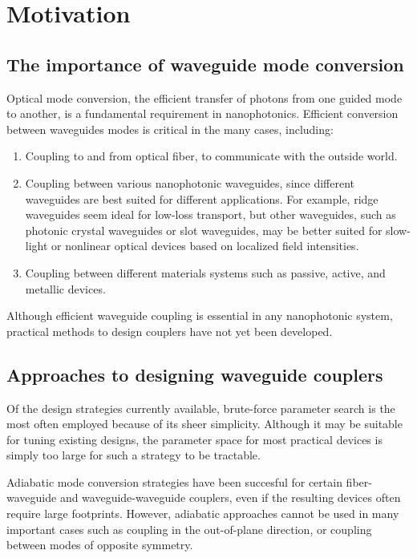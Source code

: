 \documentclass[letterpaper,10pt]{article}
\begin{document}
\section{Motivation}

\subsection{The importance of waveguide mode conversion}
Optical mode conversion, 
    the efficient transfer of photons from one guided mode to another,
    is a fundamental requirement in nanophotonics.
Efficient conversion between waveguides modes
    is critical in the many cases, including:
    \begin{enumerate}
        \item Coupling to and from optical fiber\cite{fibergrating}, 
        to communicate with the outside world.
    \item Coupling between various nanophotonic waveguides, 
        since different waveguides are best suited for different applications.
        For example, ridge waveguides seem ideal for 
            low-loss transport\cite{ridge},
            but other waveguides, 
            such as photonic crystal waveguides or slot waveguides,
            may be better suited for slow-light\cite{pcslow} 
            or nonlinear optical devices based on 
            localized field intensities\cite{slotfocus}.
    \item Coupling between different materials systems such as
       passive, active\cite{active}, and metallic\cite{metallic} devices. 
    \end{enumerate}
Although efficient waveguide coupling is essential in any nanophotonic system,
    practical methods to design couplers have not yet been developed.

\subsection{Approaches to designing waveguide couplers}
Of the design strategies currently available,
    brute-force parameter search is the most often employed 
    because of its sheer simplicity.
Although it may be suitable for tuning existing designs,
    the parameter space for most practical devices is simply too large
    for such a strategy to be tractable.

Adiabatic mode conversion strategies have been succesful
    for certain fiber-waveguide\cite{fwadia} and 
    waveguide-waveguide\cite{wwadia} couplers,
    even if the resulting devices often require large footprints.
However, adiabatic approaches cannot be used in many important cases 
    such as coupling in the out-of-plane direction, or
    coupling between modes of opposite symmetry.
\end{document}
